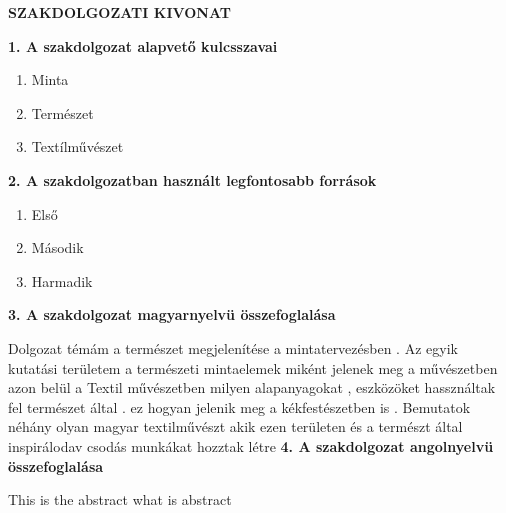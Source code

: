 \thispagestyle{plain}
\begin{center}
    \Large
    \textbf{SZAKDOLGOZATI KIVONAT}
\end{center}
\textbf{1. A szakdolgozat alapvető kulcsszavai}
\begin{enumerate}[label=\alph*)]
	\item Minta
	\item Természet
	\item Textílművészet
\end{enumerate}
\textbf{2. A szakdolgozatban használt legfontosabb források}
\begin{enumerate}[label=\alph*)]
	\item Első
	\item Második
	\item Harmadik
\end{enumerate}
\newpage
\textbf{3. A szakdolgozat magyarnyelvü összefoglalása}

Dolgozat témám a természet megjelenítése a mintatervezésben .
Az egyik kutatási területem a természeti mintaelemek miként jelenek meg a művészetben azon belül a Textil művészetben milyen alapanyagokat , eszközöket  hassználtak fel természet által .
ez hogyan jelenik  meg a kékfestészetben is .
Bemutatok néhány olyan magyar textilművészt akik ezen területen és a természt által inspirálodav csodás munkákat hozztak létre 
\newpage
\textbf{4. A szakdolgozat angolnyelvü összefoglalása}

\begin{otherlanguage}{english}
This is the abstract what is abstract
\end{otherlanguage}
\newpage